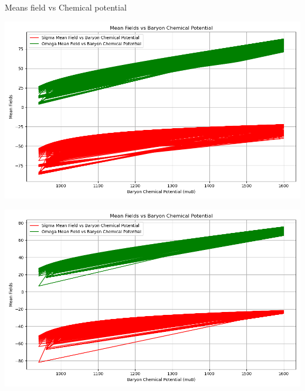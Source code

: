 \documentclass[12pt,aspectratio169]{beamer}
\begin{document}
\begin{frame}{Means field vs Chemical potential}
\begin{minipage}[t]{0.48\textwidth}
  \centering
  \includegraphics[width=0.9\linewidth]{mean_fields_vs_chemical_potentials1.png}
\end{minipage}
\hfill
\begin{minipage}[t]{0.48\textwidth}
  \centering
  \includegraphics[width=0.9\linewidth]{mean_fields_vs_chemical_potentials2.png}
\end{minipage}

\vspace{0.5cm}


\end{frame}
\end{document}
